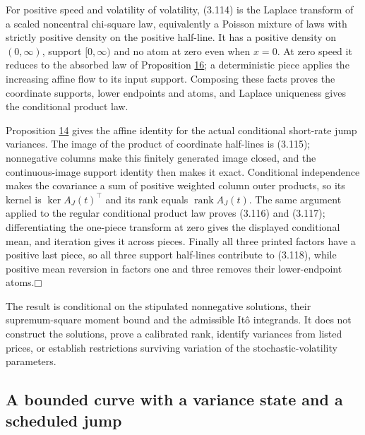 \documentclass[11pt]{article}
\providecommand{\square}{\mdlgwhtsquare}
\begin{document}
For positive speed and volatility of volatility, (3.114) is the Laplace transform of a scaled noncentral chi-square law, equivalently a Poisson mixture of laws with strictly positive density on the positive half-line. It has a positive density on \((0,\infty)\), support \([0,\infty)\) and no atom at zero even when \(x=0\). At zero speed it reduces to the absorbed law of Proposition \hyperref[res:Proposition-16]{16}; a deterministic piece applies the increasing affine flow to its input support. Composing these facts proves the coordinate supports, lower endpoints and atoms, and Laplace uniqueness gives the conditional product law.

Proposition \hyperref[res:Proposition-14]{14} gives the affine identity for the actual conditional short-rate jump variances. The image of the product of coordinate half-lines is (3.115); nonnegative columns make this finitely generated image closed, and the continuous-image support identity then makes it exact. Conditional independence makes the covariance a sum of positive weighted column outer products, so its kernel is \(\ker A_J(t)^\top\) and its rank equals \(\operatorname{rank}A_J(t)\). The same argument applied to the regular conditional product law proves (3.116) and (3.117); differentiating the one-piece transform at zero gives the displayed conditional mean, and iteration gives it across pieces. Finally all three printed factors have a positive last piece, so all three support half-lines contribute to (3.118), while positive mean reversion in factors one and three removes their lower-endpoint atoms.\hfill$\square$

The result is conditional on the stipulated nonnegative solutions, their supremum-square moment bound and the admissible Itô integrands. It does not construct the solutions, prove a calibrated rank, identify variances from listed prices, or establish restrictions surviving variation of the stochastic-volatility parameters.

\subsection{A bounded curve with a variance state and a scheduled jump}\label{sec:3.24}
\end{document}
